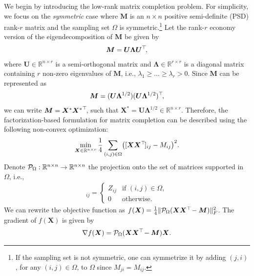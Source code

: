 \documentclass{article}
\def\P{{\cal P}}
\def\R{{\mathbb R}}
\newcommand{\hlnew}[1]{{#1}}
\newcommand{\norm}[1]{\|#1\|} %
\DeclareMathOperator*{\vect}{vec}
\newcommand{\topnew}{\top \hspace{-0.05cm}}
\begin{document}
We begin by introducing the low-rank matrix completion problem. For simplicity, we focus on the {\em symmetric} case where $\bm M$ is an $n \times n$ positive semi-definite (PSD) rank-$r$ matrix and the sampling set $\Omega$ is symmetric.\footnote{If the sampling set is not symmetric, one can symmetrize it by adding $(j,i)$, for any $(i,j) \in \Omega$, to $\Omega$ since $M_{ji} = M_{ij}$.} Let the rank-$r$ economy version of the eigendecomposition of $\bm M$ be given by 
\begin{align*}
    \bm M = \bm U \bm \Lambda \bm U^\topnew,
\end{align*}
where $\bm U \in \R^{n \times r}$ is a semi-orthogonal matrix and $\bm \Lambda \in \R^{r \times r}$ is a diagonal matrix containing $r$ non-zero eigenvalues of $\bm M$, i.e., $\lambda_1 \geq \ldots \geq \lambda_r > 0$.
Since $\bm M$ can be represented as
\begin{align*}
    \bm M = (\bm U \bm \Lambda^{1/2}) (\bm U \bm \Lambda^{1/2})^\topnew ,
\end{align*}
we can write $\bm M = \bm X^* {\bm X^*}^\topnew$, such that $\bm X^* = \bm U \bm \Lambda^{1/2} \in \R^{n \times r}$.
Therefore, the factorization-based \hlnew{formulation} for matrix completion can be \hlnew{described} using the following non-convex optimization:
\begin{align} \label{prob:P0}
    \min_{\bm X \in \R^{n \times r}} \frac{1}{4} \sum_{(i,j) \in \Omega} \bigl( [\bm X \bm X^\topnew]_{ij} - M_{ij} \bigr)^2 .
\end{align}
Denote $\P_\Omega : \R^{n \times n} \to \R^{n \times n}$ the projection onto the set of matrices supported in $\Omega$, i.e.,
\begin{align*}
    [\P_\Omega (\bm Z)]_{ij} = \begin{cases} Z_{ij} & \text{if } (i,j) \in \Omega, \\ 0 & \text{otherwise}. \end{cases}
\end{align*}
We can rewrite the objective function as $f(\bm X) = \frac{1}{4} \norm{\P_\Omega (\bm X \bm X^\topnew - \bm M)}_F^2$.
The gradient of $f(\bm X)$ is given by
\begin{align} \label{equ:df}
    \nabla f(\bm X) = \P_\Omega (\bm X \bm X^\topnew - \bm M) \bm X .
\end{align}
\end{document}
